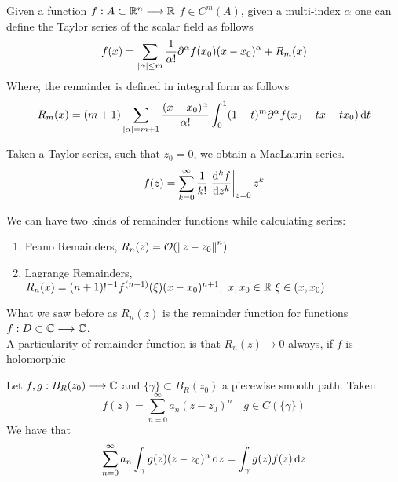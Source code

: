 \documentclass[../complete.tex]{subfiles}
\begin{document}
\begin{dfn}
	Given a function $f:A\subset\mathbb{R}^n\overset{}{\longrightarrow}\mathbb{R}$ $f\in C^m(A)$, given a multi-index $\alpha$ one can define the Taylor series of the scalar field as follows
	\begin{equation*}
		f(x)=\sum_{\abs{\alpha}\le m}\frac{1}{\alpha!}\partial^\alpha f(x_0)(x-x_0)^\alpha+R_m(x)
	\end{equation*}
	Where, the remainder is defined in integral form as follows
	\begin{equation*}
		R_m(x)=(m+1)\sum_{\abs{\alpha}=m+1}^{}\frac{(x-x_0)^\alpha}{\alpha!}\int_{0}^{1}(1-t)^m\partial^\alpha f(x_0+tx-tx_0)\operatorname{d\!} t
	\end{equation*}
\end{dfn}
\begin{dfn}
	Taken a Taylor series, such that $z_0=0$, we obtain a MacLaurin series.
	\begin{equation}
		f(z)=\sum_{k=0}^\infty\frac{1}{k!}\left.\derivative[k]{f}{z}\right|_{z=0}z^k
		\label{eq:maclaurinseries}
	\end{equation}
\end{dfn}
\begin{dfn}[Remainders]
	We can have two kinds of remainder functions while calculating series:
	\begin{enumerate}
	\item Peano Remainders, $R_n(z)=\order{\norm{z-z_0}^n}$
	\item Lagrange Remainders, $R_n(x)=(n+1)!^{-1}f^{(n+1)}(\xi)(x-x_0)^{n+1},\ x,x_0\in\R\ \xi\in(x,x_0)$
	\end{enumerate}
	What we saw before as $R_n(z)$ is the remainder function for functions $f:D\subset\mathbb{C}\overset{}{\longrightarrow}\mathbb{C}$.\\
	A particularity of remainder function is that $R_n(z)\to0$ always, if $f$ is holomorphic
\end{dfn}
\begin{thm}
	Let $f,g:B_R(z_0)\overset{}{\longrightarrow}\mathbb{C}$ and $\{\gamma\}\subset B_R(z_0)$ a piecewise smooth path. Taken
	\begin{equation*}
		f(z)=\sum_{n=0}^\infty a_n(z-z_0)^n\quad g\in C(\{\gamma\})
	\end{equation*}
	We have that
	\begin{equation}
		\sum_{n=0}^{\infty}a_n\int_{\gamma}^{}g(z)(z-z_0)^n\operatorname{d\!} z=\int_{\gamma}^{}g(z)f(z)\operatorname{d\!} z
		\label{eq:integralps2}
	\end{equation}
\end{thm}
\end{document}
